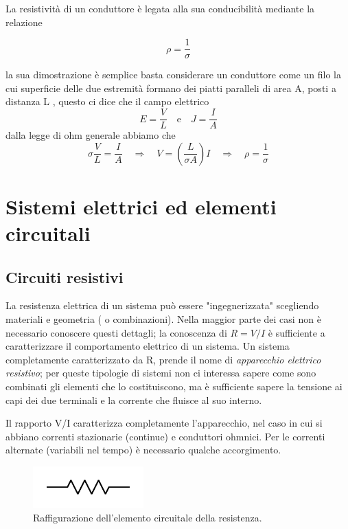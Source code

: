 La resistivit\`a di un conduttore \`e legata alla sua conducibilit\`a mediante la relazione 

\begin{equation*}
	\rho = \frac{1}{\sigma}
\end{equation*}

la sua dimostrazione \`e semplice basta considerare un conduttore come un filo la cui superficie delle due estremit\`a formano dei piatti paralleli di area A, posti a distanza L , questo ci dice che il campo elettrico 
\begin{equation*}
	E = \frac{V}{L} \quad \text{e} \quad J = \frac{I}{A}
\end{equation*}
dalla legge di ohm generale abbiamo che 
\begin{equation*}
	\sigma \frac{V}{L} = \frac{I}{A} \quad \Longrightarrow \quad V = \left( \frac{L}{\sigma A}\right)I \quad \Rightarrow \quad \rho = \frac{1}{\sigma}
\end{equation*}

\section{Sistemi elettrici ed elementi circuitali}

\subsection{Circuiti resistivi}
La resistenza elettrica di un sistema pu\`o essere "ingegnerizzata" scegliendo materiali e geometria ( o combinazioni). Nella maggior parte dei casi non \`e necessario conoscere questi dettagli; la conoscenza di $R = V/I$ \`e sufficiente a caratterizzare il comportamento elettrico di un sistema. Un sistema completamente caratterizzato da R, prende il nome di \textit{apparecchio elettrico resistivo}; per queste tipologie di sistemi non ci interessa sapere come sono combinati gli elementi che lo costituiscono, ma \`e sufficiente sapere la tensione ai capi dei due terminali e la corrente che fluisce al suo interno. 

Il rapporto V/I caratterizza completamente l'apparecchio, nel caso in cui si abbiano correnti stazionarie (continue) e conduttori ohmnici. Per le correnti alternate (variabili nel tempo) \`e necessario qualche accorgimento.

\begin{figure}
  \centering
  \includegraphics[width=0.38\textwidth]{images/resist}
  \caption{Raffigurazione dell'elemento circuitale della resistenza.}
\end{figure}

